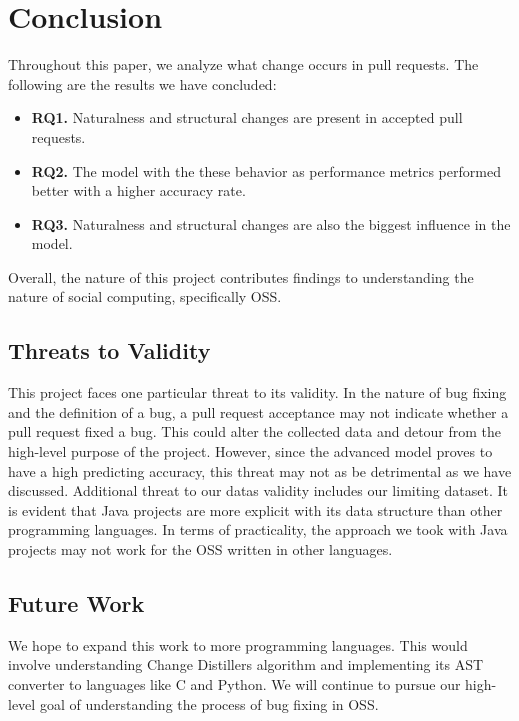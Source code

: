 \documentclass[10pt, conference]{IEEEtran}
\begin{document}
\section{Conclusion}
\label{conclusion}
\normalsize{Throughout this paper, we analyze what change occurs in pull requests. The following are the results we have concluded:

\begin{mdframed} 
\begin{itemize}
\item \textbf{RQ1.} Naturalness and structural changes are present in accepted pull requests.
\item \textbf{RQ2.} The model with the these behavior as performance metrics performed better with a higher accuracy rate.
\item \textbf{RQ3.} Naturalness and structural changes are also the biggest influence in the model.
\end{itemize}
\end{mdframed}

Overall, the nature of this project contributes findings to understanding the nature of social computing, specifically OSS. 

\subsection{Threats to Validity}
This project faces one particular threat to its validity. In the nature of bug fixing and the definition of a bug, a pull request acceptance may not indicate whether a pull request fixed a bug. This could alter the collected data and detour from the high-level purpose of the project. However, since the advanced model proves to have a high predicting accuracy, this threat may not as be detrimental as we have discussed. Additional threat to our data\textquotesingle s validity includes our limiting dataset. It is evident that Java projects are more explicit with its data structure than other programming languages. In terms of practicality, the approach we took with Java projects may not work for the OSS written in other languages.

\subsection{Future Work}
We hope to expand this work to more programming languages. This would involve understanding Change Distiller\textquotesingle s algorithm and implementing its AST converter to languages like C and Python. We will continue to pursue our high-level goal of understanding the process of bug fixing in OSS.

}
\end{document}
